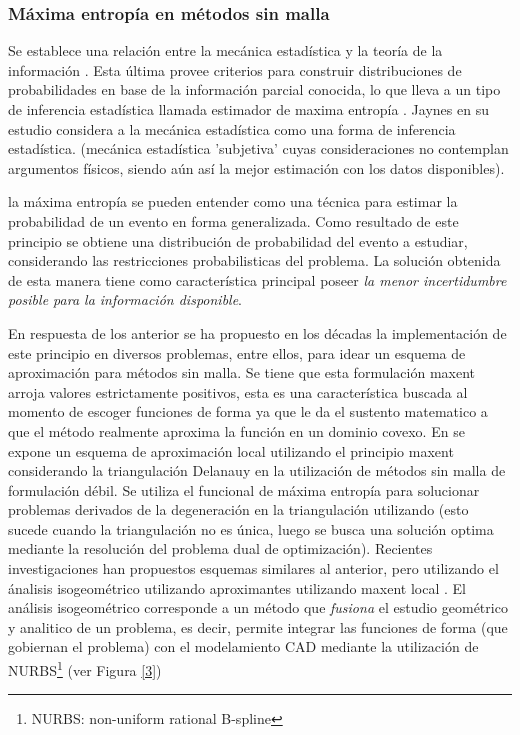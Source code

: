 
\subsubsection{Máxima entropía en métodos sin malla}

Se establece una relación entre la mecánica estadística y la teoría de la información \cite{jaynes}. Esta última provee criterios para construir distribuciones de probabilidades en base de la información parcial conocida, lo que lleva a un tipo de inferencia estadística llamada estimador de maxima entropía \cite{shannon}. Jaynes en su estudio considera a la mecánica estadística como una forma de inferencia estadística. (mecánica estadística 'subjetiva' cuyas consideraciones no contemplan argumentos físicos, siendo aún así la mejor estimación con los datos disponibles).

la máxima entropía se pueden entender como una técnica para estimar la probabilidad de un evento en forma generalizada. Como resultado de este principio se obtiene una distribución de probabilidad del evento a estudiar, considerando las restricciones probabilisticas del problema.  La solución obtenida de esta manera tiene como característica principal poseer \textit{la menor incertidumbre posible para la información disponible}.

En respuesta de los anterior se ha propuesto en los décadas la implementación de este principio en diversos problemas, entre ellos, para idear un esquema de aproximación para métodos sin malla. Se tiene que esta formulación maxent arroja valores estrictamente positivos, esta es una característica buscada al momento de escoger funciones de forma ya que le da el sustento matematico a que el método realmente aproxima la función en un dominio covexo. En \cite{arroyo} se expone un esquema de aproximación local utilizando el principio maxent considerando la triangulación Delanauy en la utilización de métodos sin malla de formulación débil. Se utiliza el funcional de máxima entropía para solucionar problemas derivados de la degeneración en la triangulación utilizando (esto sucede cuando la triangulación no es única, luego se busca una solución optima mediante la resolución del problema dual de optimización). Recientes investigaciones han propuestos esquemas similares al anterior, pero utilizando el ánalisis isogeométrico utilizando aproximantes utilizando maxent local \cite{IGA_LME}. El análisis isogeométrico corresponde a un método que \textit{fusiona} el estudio geométrico y analitico de un problema, es decir, permite integrar las funciones de forma (que gobiernan el problema) con el modelamiento CAD mediante la utilización de NURBS\footnote{NURBS: non-uniform rational B-spline} (ver Figura \ref{3})   %

